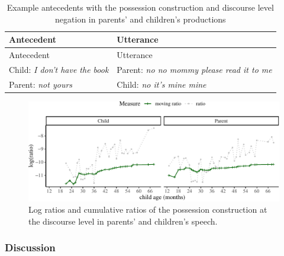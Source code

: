 \documentclass[
  english,
  man,floatsintext]{apa6}
\begin{document}
\begin{longtable}[]{@{}ll@{}}
\caption{\label{tab:dispossess} Example antecedents with the possession construction and discourse level negation in parents' and children's productions}\tabularnewline
\toprule
Antecedent & Utterance \\
\midrule
\endfirsthead
\toprule
Antecedent & Utterance \\
\midrule
\endhead
Child: \emph{I don't have the book} & Parent: \emph{no no mommy please read it to me} \\
Parent: \emph{not yours} & Child: \emph{no it's mine mine} \\
\bottomrule
\end{longtable}

\begin{figure}[H]

{\centering \includegraphics{neg_construction_article_files/figure-latex/possessiondiscourse-1} 

}

\caption{Log ratios and cumulative ratios of the possession construction at the discourse level in parents' and children's speech.}\label{fig:possessiondiscourse}
\end{figure}

\hypertarget{discussion}{%
\subsubsection{Discussion}\label{discussion}}
\end{document}
